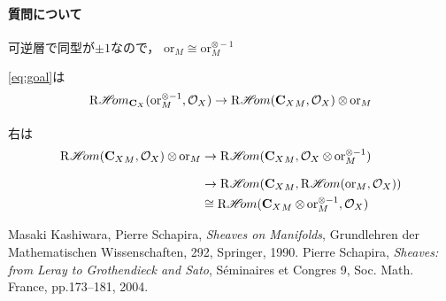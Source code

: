 \documentclass[uplatex,dvipdfmx,a4paper,10pt,draft]{jsarticle}
\theoremstyle{definition}
\newcommand{\cc}{\mathbf{C}}
\newcommand{\mcal}{\mathcal}
\numberwithin{equation}{section}
\newcommand{\cO}{\mcal{O}}
\newcommand{\HOM}{\mathop{\mathscr{H}\hspace{-2pt}om}\nolimits}%
\newcommand{\RHOM}{\mathop{\mathrm{R}\hspace{-1.5pt}\HOM}\nolimits}
\newcommand{\ori}{\mathord{\mathrm{or}}}
\newcommand{\tens}[1][]{\mathbin{\otimes_{\raise1.5ex\hbox to-.1em{}{#1}}}}
\newcommand{\ttens}[1][]{\mathbin{\mathop{\overset{\mathrm{}}{\tens}}_{#1}}}
\theoremstyle{mystyle}
\begin{document}
\paragraph{質問について}

可逆層で同型が\(\pm1\)なので，
\(\ori_M\cong\ori_{M}^{\otimes -1}\)

\eqref{eq:goal}は
\[
    \RHOM_{\cc_X}(\ori_{M}^{\otimes -1},\cO_X)%
    \to
    \RHOM({\cc_{X}}_{M},\cO_X)\ttens[]\ori_{M}
\]
右は
\begin{align*}
    \RHOM({\cc_{X}}_{M},\cO_X)\ttens[]\ori_{M}
    &\to
    \RHOM({\cc_{X}}_{M},\cO_X\ttens[]\ori_{M}^{\otimes -1})\\
    &\to
    \RHOM({\cc_{X}}_{M},\RHOM(\ori_{M},\cO_X))\\
    &\cong
    \RHOM({\cc_{X}}_{M}\tens[]\ori_{M}^{\otimes -1},\cO_X)
\end{align*}






\begin{thebibliography}{20} 
     Masaki Kashiwara, Pierre Schapira, 
      \textit{Sheaves on Manifolds}, 
      Grundlehren der Mathematischen Wissenschaften, 292, Springer, 1990.
     Pierre Schapira, 
      \textit{Sheaves: from Leray to Grothendieck and Sato}, 
      S\'eminaires et Congres 9, Soc. Math. France, pp.173--181, 2004.
\end{thebibliography}
  
\end{document}

